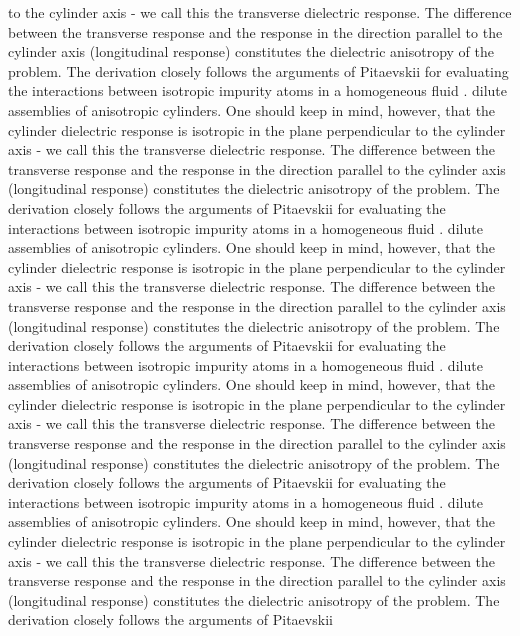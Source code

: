 \documentclass[onecolumn,letterpaper,amsmath,amssymb,floatfix,aps,superscriptaddress]{revtex4}
\begin{document}
to the cylinder axis - we call this the transverse dielectric response. The difference between the transverse response and the response in the direction parallel 
to the cylinder axis (longitudinal response) constitutes the dielectric anisotropy of the problem. The derivation closely follows the arguments of Pitaevskii 
for evaluating the interactions between isotropic impurity 
atoms in a homogeneous fluid \cite{Pitaevskii}. 
dilute assemblies of anisotropic cylinders. One should keep in mind, however, that the cylinder dielectric response is isotropic in the plane perpendicular 
to the cylinder axis - we call this the transverse dielectric response. The difference between the transverse response and the response in the direction parallel 
to the cylinder axis (longitudinal response) constitutes the dielectric anisotropy of the problem. The derivation closely follows the arguments of Pitaevskii 
for evaluating the interactions between isotropic impurity 
atoms in a homogeneous fluid \cite{Pitaevskii}. 
dilute assemblies of anisotropic cylinders. One should keep in mind, however, that the cylinder dielectric response is isotropic in the plane perpendicular 
to the cylinder axis - we call this the transverse dielectric response. The difference between the transverse response and the response in the direction parallel 
to the cylinder axis (longitudinal response) constitutes the dielectric anisotropy of the problem. The derivation closely follows the arguments of Pitaevskii 
for evaluating the interactions between isotropic impurity 
atoms in a homogeneous fluid \cite{Pitaevskii}. 
dilute assemblies of anisotropic cylinders. One should keep in mind, however, that the cylinder dielectric response is isotropic in the plane perpendicular 
to the cylinder axis - we call this the transverse dielectric response. The difference between the transverse response and the response in the direction parallel 
to the cylinder axis (longitudinal response) constitutes the dielectric anisotropy of the problem. The derivation closely follows the arguments of Pitaevskii 
for evaluating the interactions between isotropic impurity 
atoms in a homogeneous fluid \cite{Pitaevskii}. 
dilute assemblies of anisotropic cylinders. One should keep in mind, however, that the cylinder dielectric response is isotropic in the plane perpendicular 
to the cylinder axis - we call this the transverse dielectric response. The difference between the transverse response and the response in the direction parallel 
to the cylinder axis (longitudinal response) constitutes the dielectric anisotropy of the problem. The derivation closely follows the arguments of Pitaevskii 
\end{document}
